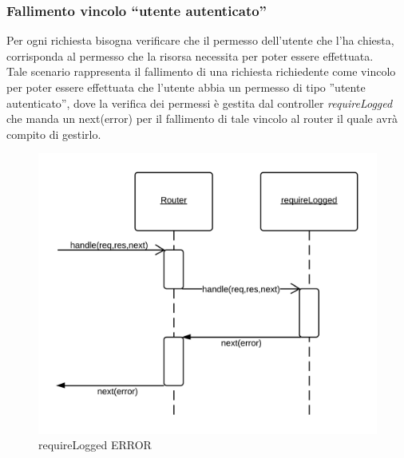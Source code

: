 \subsubsection{Fallimento vincolo ``utente autenticato''}
Per ogni richiesta bisogna verificare che il permesso dell'utente che l'ha chiesta, corrisponda al permesso che la risorsa necessita per poter essere effettuata. \\
Tale scenario rappresenta il fallimento di una richiesta richiedente come vincolo per poter essere effettuata che l'utente abbia un permesso di tipo ''utente autenticato'', dove la verifica dei permessi è gestita dal controller \emph{requireLogged} che manda un next(error) per il fallimento di tale vincolo al router il quale avrà compito di gestirlo.
\begin{figure}[H]
	\begin{center} 
		\includegraphics[scale=0.20]{scenari/requireLogged ERROR.png} 
		\caption{requireLogged ERROR}
	\end{center} 
\end{figure}

